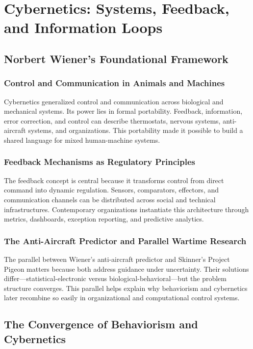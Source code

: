 \documentclass[11pt, a4paper]{article}
\begin{document}
\section{Cybernetics: Systems, Feedback, and Information Loops}

\subsection{Norbert Wiener's Foundational Framework}

\subsubsection{Control and Communication in Animals and Machines}
Cybernetics generalized control and communication across biological and mechanical systems. Its power lies in formal portability. Feedback, information, error correction, and control can describe thermostats, nervous systems, anti-aircraft systems, and organizations. This portability made it possible to build a shared language for mixed human-machine systems.

\subsubsection{Feedback Mechanisms as Regulatory Principles}
The feedback concept is central because it transforms control from direct command into dynamic regulation. Sensors, comparators, effectors, and communication channels can be distributed across social and technical infrastructures. Contemporary organizations instantiate this architecture through metrics, dashboards, exception reporting, and predictive analytics.

\subsubsection{The Anti-Aircraft Predictor and Parallel Wartime Research}
The parallel between Wiener's anti-aircraft predictor and Skinner's Project Pigeon matters because both address guidance under uncertainty. Their solutions differ---statistical-electronic versus biological-behavioral---but the problem structure converges. This parallel helps explain why behaviorism and cybernetics later recombine so easily in organizational and computational control systems.

\subsection{The Convergence of Behaviorism and Cybernetics}
\end{document}
